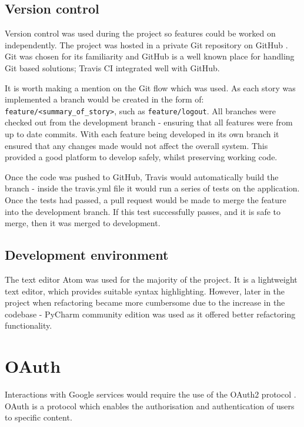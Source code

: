 \subsection{Version control}
Version control was used during the project so features could be worked on independently. The project was hosted in a private Git \cite{citeulike:14023846} repository on GitHub \cite{citeulike:13269771}. Git was chosen for its familiarity and GitHub is a well known place for handling Git based solutions; Travis CI integrated well with GitHub.

It is worth making a mention on the Git flow which was used. As each story was implemented a branch would be created in the form of: \texttt{feature/<summary\_of\_story>}, such as \texttt{feature/logout}. All branches were checked out from the development branch - ensuring that all features were from up to date commits. With each feature being developed in its own branch it ensured that any changes made would not affect the overall system. This provided a good platform to develop safely, whilst preserving working code.

Once the code was pushed to GitHub, Travis would automatically build the branch - inside the travis.yml file it would run a series of tests on the application. Once the tests had passed, a pull request would be made to merge the feature into the development branch. If this test successfully passes, and it is safe to merge, then it was merged to development.

\subsection{Development environment}
The text editor Atom \cite{citeulike:14023852} was used for the majority of the project. It is a lightweight text editor, which provides suitable syntax highlighting. However, later in the project when refactoring became more cumbersome due to the increase in the codebase - PyCharm community edition \cite{citeulike:14023855} was used as it offered better refactoring functionality.

\section{OAuth} \label{design:oauth}
Interactions with Google services would require the use of the OAuth2 protocol \cite{citeulike:11836766}. OAuth is a protocol which enables the authorisation and authentication of users to specific content.

